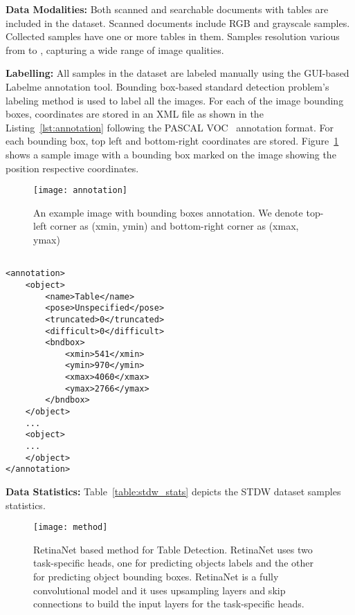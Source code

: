 \documentclass[a4paper,conference]{IEEEtran}
\begin{document}
\textbf{Data Modalities:} Both scanned and searchable documents with tables are included in the dataset. Scanned documents include RGB and grayscale samples. Collected samples have one or more tables in them. Samples resolution various from  to , capturing a wide range of image qualities. 

\textbf{Labelling:} All samples in the dataset are labeled manually using the GUI-based Labelme \cite{labelme} annotation tool. Bounding box-based standard detection problem's labeling method is used to label all the images. For each of the image bounding boxes, coordinates are stored in an XML file as shown in the Listing~\ref{lst:annotation} following the PASCAL VOC~\cite{pascal_voc} annotation format.
For each bounding box, top left  and bottom-right  coordinates are stored. Figure~\ref{fig:annotation} shows a sample image with a bounding box marked on the image showing the position respective coordinates.

\begin{figure}
  \centering
      \texttt{[image: annotation]}
\caption{An example image with bounding boxes annotation. We denote top-left corner as (xmin, ymin) and bottom-right corner as (xmax, ymax)}
\label{fig:annotation}
\end{figure}

\begin{lstlisting}[float,caption=An example XML file content showing the annotation for a single bounding box.,label=lst:annotation]

<annotation>
	<object>
		<name>Table</name>
		<pose>Unspecified</pose>
		<truncated>0</truncated>
		<difficult>0</difficult>
		<bndbox>
			<xmin>541</xmin>
			<ymin>970</ymin>
			<xmax>4060</xmax>
			<ymax>2766</ymax>
		</bndbox>
	</object>
	...
	<object>
	...
	</object>
</annotation>
\end{lstlisting}





\textbf{Data Statistics:}
Table~\ref{table:stdw_stats} depicts the STDW dataset samples statistics. 


\begin{figure*}
  \centering
      \texttt{[image: method]}
\caption{RetinaNet based method for Table Detection. RetinaNet uses two task-specific heads, one for predicting objects labels and the other for predicting object bounding boxes.  RetinaNet is a fully convolutional model and it uses upsampling layers and skip connections to build the input layers for the task-specific heads.}
\label{fig:method}
\end{figure*}
\end{document}
